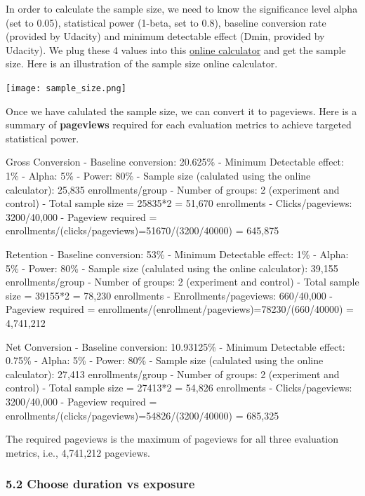 \documentclass[11pt]{article}
\begin{document}
    In order to calculate the sample size, we need to know the significance
level alpha (set to 0.05), statistical power (1-beta, set to 0.8),
baseline conversion rate (provided by Udacity) and minimum detectable
effect (Dmin, provided by Udacity). We plug these 4 values into this
\href{http://www.evanmiller.org/ab-testing/sample-size.html}{online
calculator} and get the sample size. Here is an illustration of the
sample size online calculator.

    \texttt{[image: sample\_size.png]}

    Once we have calulated the sample size, we can convert it to pageviews.
Here is a summary of \textbf{pageviews} required for each evaluation
metrics to achieve targeted statistical power.

    Gross Conversion - Baseline conversion: 20.625\% - Minimum Detectable
effect: 1\% - Alpha: 5\% - Power: 80\% - Sample size (calulated using
the online calculator): 25,835 enrollments/group - Number of groups: 2
(experiment and control) - Total sample size = 25835*2 = 51,670
enrollments - Clicks/pageviews: 3200/40,000 - Pageview required =
enrollments/(clicks/pageviews)=51670/(3200/40000) = 645,875

    Retention - Baseline conversion: 53\% - Minimum Detectable effect: 1\% -
Alpha: 5\% - Power: 80\% - Sample size (calulated using the online
calculator): 39,155 enrollments/group - Number of groups: 2 (experiment
and control) - Total sample size = 39155*2 = 78,230 enrollments -
Enrollments/pageviews: 660/40,000 - Pageview required =
enrollments/(enrollment/pageviews)=78230/(660/40000) = 4,741,212

    Net Conversion - Baseline conversion: 10.93125\% - Minimum Detectable
effect: 0.75\% - Alpha: 5\% - Power: 80\% - Sample size (calulated using
the online calculator): 27,413 enrollments/group - Number of groups: 2
(experiment and control) - Total sample size = 27413*2 = 54,826
enrollments - Clicks/pageviews: 3200/40,000 - Pageview required =
enrollments/(clicks/pageviews)=54826/(3200/40000) = 685,325

    The required pageviews is the maximum of pageviews for all three
evaluation metrics, i.e., 4,741,212 pageviews.

    \hypertarget{choose-duration-vs-exposure}{%
\subsubsection{5.2 Choose duration vs
exposure}\label{choose-duration-vs-exposure}}
\end{document}
